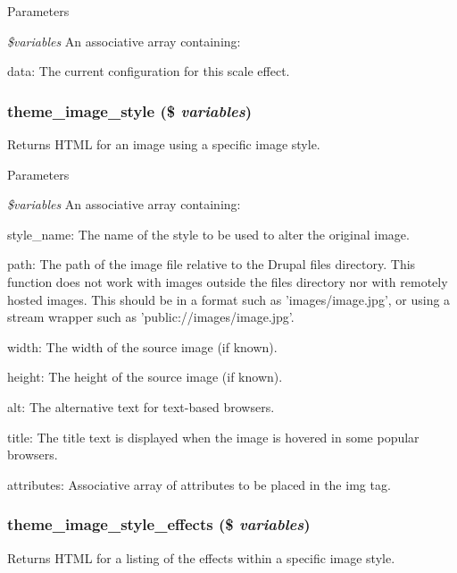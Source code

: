 \begin{DoxyParams}{Parameters}
\item[{\em \$variables}]An associative array containing:
\begin{DoxyItemize}
\item data: The current configuration for this scale effect. 
\end{DoxyItemize}\end{DoxyParams}
\hypertarget{group__themeable_ga18305f3777e7a1e9e5ffcf253b39bbd5}{
\subsubsection[{theme\_\-image\_\-style}]{\setlength{\rightskip}{0pt plus 5cm}theme\_\-image\_\-style (\$ {\em variables})}}
\label{group__themeable_ga18305f3777e7a1e9e5ffcf253b39bbd5}
Returns HTML for an image using a specific image style.


\begin{DoxyParams}{Parameters}
\item[{\em \$variables}]An associative array containing:
\begin{DoxyItemize}
\item style\_\-name: The name of the style to be used to alter the original image.
\item path: The path of the image file relative to the Drupal files directory. This function does not work with images outside the files directory nor with remotely hosted images. This should be in a format such as 'images/image.jpg', or using a stream wrapper such as 'public://images/image.jpg'.
\item width: The width of the source image (if known).
\item height: The height of the source image (if known).
\item alt: The alternative text for text-\/based browsers.
\item title: The title text is displayed when the image is hovered in some popular browsers.
\item attributes: Associative array of attributes to be placed in the img tag. 
\end{DoxyItemize}\end{DoxyParams}
\hypertarget{group__themeable_ga1227448c909cd1606cb18928876958f2}{
\subsubsection[{theme\_\-image\_\-style\_\-effects}]{\setlength{\rightskip}{0pt plus 5cm}theme\_\-image\_\-style\_\-effects (\$ {\em variables})}}
\label{group__themeable_ga1227448c909cd1606cb18928876958f2}
Returns HTML for a listing of the effects within a specific image style.


